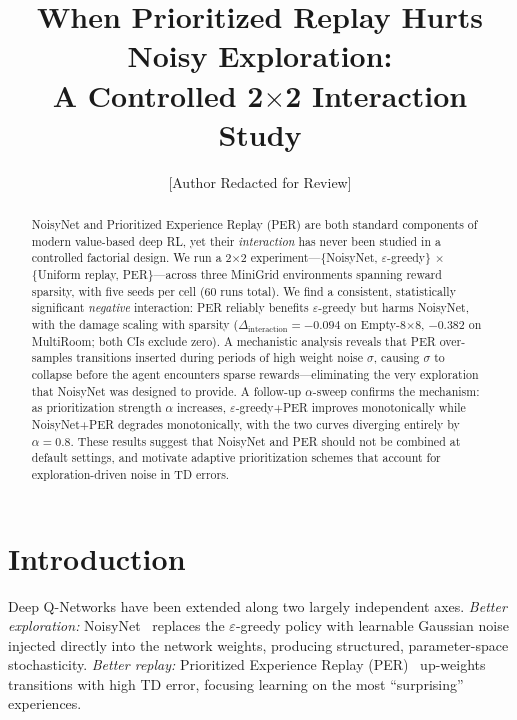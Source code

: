 \documentclass{article}
\title{When Prioritized Replay Hurts Noisy Exploration:\\
       A Controlled 2$\times$2 Interaction Study}
\author{%
  [Author Redacted for Review]
}
\begin{document}
\maketitle

\begin{abstract}
NoisyNet and Prioritized Experience Replay (PER) are both standard components
of modern value-based deep RL, yet their \emph{interaction} has never been
studied in a controlled factorial design.
We run a 2$\times$2 experiment---\{NoisyNet, $\varepsilon$-greedy\} $\times$
\{Uniform replay, PER\}---across three MiniGrid environments spanning reward
sparsity, with five seeds per cell (60 runs total).
We find a consistent, statistically significant \emph{negative} interaction:
PER reliably benefits $\varepsilon$-greedy but harms NoisyNet, with the
damage scaling with sparsity
($\Delta_\text{interaction} = -0.094$ on Empty-8$\times$8,
$-0.382$ on MultiRoom; both CIs exclude zero).
A mechanistic analysis reveals that PER over-samples transitions inserted
during periods of high weight noise $\sigma$, causing $\sigma$ to collapse
before the agent encounters sparse rewards---eliminating the very exploration
that NoisyNet was designed to provide.
A follow-up $\alpha$-sweep confirms the mechanism: as prioritization
strength $\alpha$ increases, $\varepsilon$-greedy$+$PER improves monotonically
while NoisyNet$+$PER degrades monotonically, with the two curves
diverging entirely by $\alpha{=}0.8$.
These results suggest that NoisyNet and PER should not be combined at
default settings, and motivate adaptive prioritization schemes that account
for exploration-driven noise in TD errors.
\end{abstract}

\section{Introduction}

Deep Q-Networks have been extended along two largely independent axes.
\emph{Better exploration:} NoisyNet~\cite{fortunato2017noisy} replaces the
$\varepsilon$-greedy policy with learnable Gaussian noise injected directly
into the network weights, producing structured, parameter-space stochasticity.
\emph{Better replay:} Prioritized Experience Replay
(PER)~\cite{schaul2016prioritized} up-weights transitions with high TD error,
focusing learning on the most ``surprising'' experiences.
\end{document}
